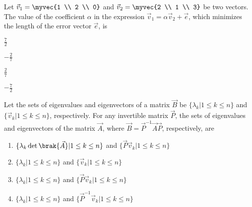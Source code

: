     \item Let $\vec{v}_1 = \myvec{1 \\ 2 \\ 0}$ and $\vec{v}_2 = \myvec{2 \\ 1 \\ 3}$ be two vectors. The value of the coefficient $\alpha$ in the expression $\vec{v}_1 = \alpha \vec{v}_2 + \vec{e}$, which minimizes the length of the error vector $\vec{e}$, is
    \hfill{}
    \begin{enumerate}
    \begin{multicols}{4}
        \item $\frac{7}{2}$
        \item $-\frac{2}{7}$
        \item $\frac{2}{7}$
        \item $-\frac{7}{2}$
    \end{multicols}
    \end{enumerate}
\item Let the sets of eigenvalues and eigenvectors of a matrix $\vec{B}$ be $\{\lambda_k | 1 \le k \le n\}$ and $\{\vec{v}_k | 1 \le k \le n\}$, respectively. For any invertible matrix $\vec{P}$, the sets of eigenvalues and eigenvectors of the matrix $\vec{A}$, where $\vec{B} = \vec{P}^{-1}\vec{A}\vec{P}$, respectively, are
    \hfill{}
    \begin{enumerate}
        \item $\{\lambda_k \det\brak{\vec{A}} | 1 \le k \le n\}$ and $\{\vec{P}\vec{v}_k | 1 \le k \le n\}$
        \item $\{\lambda_k | 1 \le k \le n\}$ and $\{\vec{v}_k | 1 \le k \le n\}$
        \item $\{\lambda_k | 1 \le k \le n\}$ and $\{\vec{P}\vec{v}_k | 1 \le k \le n\}$
        \item $\{\lambda_k | 1 \le k \le n\}$ and $\{\vec{P}^{-1}\vec{v}_k | 1 \le k \le n\}$
    \end{enumerate}
